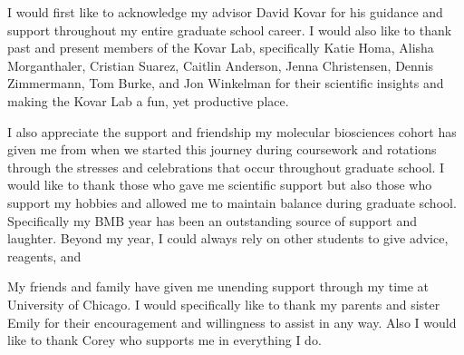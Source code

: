 \acknowledgments
I would first like to acknowledge my advisor David Kovar for his guidance and support throughout my entire graduate school career. I would also like to thank past and present members of the Kovar Lab, specifically Katie Homa, Alisha Morganthaler, Cristian Suarez, Caitlin Anderson, Jenna Christensen, Dennis Zimmermann, Tom Burke, and Jon Winkelman for their scientific insights and making the Kovar Lab a fun, yet productive place. 

I also appreciate the support and friendship my molecular biosciences cohort has given me from when we started this journey during coursework and rotations through the stresses and celebrations that occur throughout graduate school. I would like to thank those who gave me scientific support but also those who support my hobbies and allowed me to maintain balance during graduate school. Specifically my BMB year has been an outstanding source of support and laughter. Beyond my year, I could always rely on other students to give advice, reagents, and 

My friends and family have given me unending support through my time at University of Chicago. I would specifically like to thank my parents and sister Emily for their encouragement and willingness to assist in any way. Also I would like to thank Corey who supports me in everything I do.